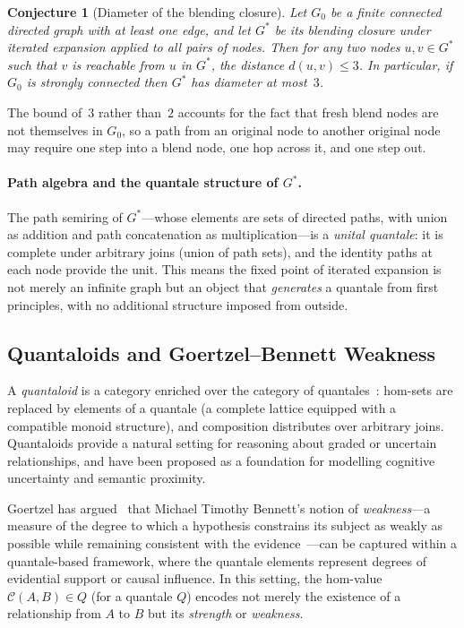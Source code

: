\documentclass[11pt, a4paper]{article}
\theoremstyle{definition}
\theoremstyle{plain}
\newtheorem{conj}{Conjecture}[section]
\theoremstyle{remark}
\begin{document}
\begin{conj}[Diameter of the blending closure]
\label{conj:diameter}
Let $G_0$ be a finite connected directed graph with at least one edge, and let
$G^*$ be its blending closure under iterated expansion applied to all pairs of
nodes.  Then for any two nodes $u, v \in G^*$ such that $v$ is reachable from
$u$ in $G^*$, the distance $d(u, v) \leq 3$.  In particular, if $G_0$ is
strongly connected then $G^*$ has diameter at most~$3$.
\end{conj}

The bound of~$3$ rather than~$2$ accounts for the fact that fresh blend nodes
are not themselves in $G_0$, so a path from an original node to another
original node may require one step into a blend node, one hop across it, and
one step out.

\paragraph{Path algebra and the quantale structure of $G^*$.}

The path semiring of $G^*$---whose elements are sets of directed paths, with
union as addition and path concatenation as multiplication---is a
\emph{unital quantale}: it is complete under arbitrary joins (union of path
sets), and the identity paths at each node provide the unit.  This means the
fixed point of iterated expansion is not merely an infinite graph but an object
that \emph{generates} a quantale from first principles, with no additional
structure imposed from outside.

\subsection*{Quantaloids and Goertzel--Bennett Weakness}

A \emph{quantaloid} is a category enriched over the category of
quantales~\cite{rosenthal1996}: hom-sets are replaced by elements of a quantale
(a complete lattice equipped with a compatible monoid structure), and
composition distributes over arbitrary joins.  Quantaloids provide a natural
setting for reasoning about graded or uncertain relationships, and have been
proposed as a foundation for modelling cognitive uncertainty and semantic
proximity.

Goertzel has argued~\cite{goertzel2023} that Michael Timothy Bennett's notion of
\emph{weakness}---a measure of the degree to which a hypothesis constrains its
subject as weakly as possible while remaining consistent with the
evidence~\cite{bennett2023,bennett2022}---can be captured within a quantale-based
framework, where the quantale elements represent degrees of evidential support
or causal influence.  In this setting, the hom-value $\mathcal{C}(A, B) \in Q$
(for a quantale $Q$) encodes not merely the existence of a relationship from
$A$ to $B$ but its \emph{strength} or \emph{weakness}.
\end{document}

